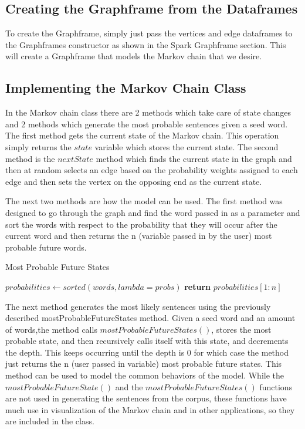 \documentclass[9pt,twocolumn,twoside]{idsi}
\begin{document}
\subsection{Creating the Graphframe from the Dataframes}
To create the Graphframe, simply just pass the vertices and edge dataframes to the Graphframes constructor as shown in the Spark Graphframe section. This will create a Graphframe that models the Markov chain that we desire.

\subsection{Implementing the Markov Chain Class}
In the Markov chain class there are 2 methods which take care of state changes and 2 methods which generate the most probable sentences given a seed word. The first method gets the current state of the Markov chain. This operation simply returns the $state$ variable which stores the current state. 
 The second method is the $nextState$ method which finds the current state in the graph and then at random selects an edge based on the probability weights assigned to each edge and then sets the vertex on the opposing end as the current state.  

The next two methods are how the model can be used. The first method was designed to go through the graph and find the word passed in as a parameter and sort the words with respect to the probability that they will occur after the current word and then returns the n (variable passed in by the user) most probable future words.  
\begin{algorithm}
\caption{Most Probable Future States}\label{alg:euclid}
\begin{algorithmic}[1]
\State $probabilities\gets sorted(words, lambda=probs)$
\State \textbf{return} $probabilities[1:n]$
\EndProcedure
\end{algorithmic}
\end{algorithm}

The next method generates the most likely sentences using the previously described mostProbableFutureStates method. Given a seed word and an amount of words,the method calls $mostProbableFutureStates()$, stores the most probable state, and then recursively calls itself  with this state, and decrements the depth. This keeps occurring until the depth is 0 for which case the method just returns the n (user passed in variable) most probable future states. This method can be used to model the common behaviors of the model.
While the $mostProbableFutureState()$ and the $mostProbableFutureStates()$ functions are not used in generating the sentences from the corpus, these functions have much use in visualization of the Markov chain and in other applications, so they are included in the class.
\end{document}
